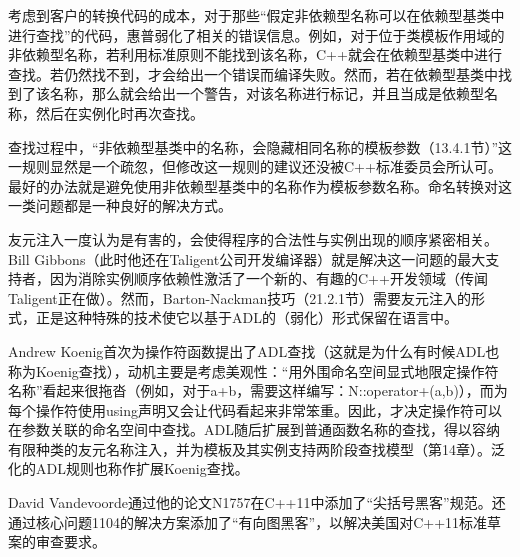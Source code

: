考虑到客户的转换代码的成本，对于那些“假定非依赖型名称可以在依赖型基类中进行查找”的代码，惠普弱化了相关的错误信息。例如，对于位于类模板作用域的非依赖型名称，若利用标准原则不能找到该名称，C++就会在依赖型基类中进行查找。若仍然找不到，才会给出一个错误而编译失败。然而，若在依赖型基类中找到了该名称，那么就会给出一个警告，对该名称进行标记，并且当成是依赖型名称，然后在实例化时再次查找。

查找过程中，“非依赖型基类中的名称，会隐藏相同名称的模板参数（13.4.1节）”这一规则显然是一个疏忽，但修改这一规则的建议还没被C++标准委员会所认可。最好的办法就是避免使用非依赖型基类中的名称作为模板参数名称。命名转换对这一类问题都是一种良好的解决方式。

友元注入一度认为是有害的，会使得程序的合法性与实例出现的顺序紧密相关。Bill Gibbons（此时他还在Taligent公司开发编译器）就是解决这一问题的最大支持者，因为消除实例顺序依赖性激活了一个新的、有趣的C++开发领域（传闻Taligent正在做）。然而，Barton-Nackman技巧（21.2.1节）需要友元注入的形式，正是这种特殊的技术使它以基于ADL的（弱化）形式保留在语言中。

Andrew Koenig首次为操作符函数提出了ADL查找（这就是为什么有时候ADL也称为Koenig查找），动机主要是考虑美观性：“用外围命名空间显式地限定操作符名称”看起来很拖沓（例如，对于a+b，需要这样编写：N::operator+(a,b)），而为每个操作符使用using声明又会让代码看起来非常笨重。因此，才决定操作符可以在参数关联的命名空间中查找。ADL随后扩展到普通函数名称的查找，得以容纳有限种类的友元名称注入，并为模板及其实例支持两阶段查找模型（第14章）。泛化的ADL规则也称作扩展Koenig查找。

David Vandevoorde通过他的论文N1757在C++11中添加了“尖括号黑客”规范。还通过核心问题1104的解决方案添加了“有向图黑客”，以解决美国对C++11标准草案的审查要求。
